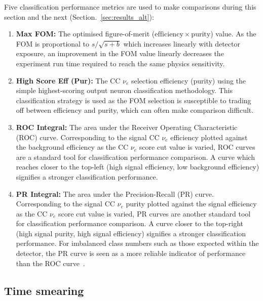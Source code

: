 Five classification performance metrics are used to make comparisons during this section and the
next (Section.~\ref{sec:results_alt}):
\begin{enumerate}
    \item \textbf{Max FOM:} The optimised figure-of-merit
          ($\mathrm{efficiency}\times\mathrm{purity}$) value. As the FOM is proportional to
          $s/\sqrt{s+b}$ which increases linearly with detector exposure, an improvement in the
          FOM value linearly decreases the experiment run time required to reach the same physics
          sensitivity.
    \item \textbf{High Score Eff (Pur):} The CC $\nu_{e}$ selection efficiency (purity) using the
          simple highest-scoring output neuron classification methodology. This classification
          strategy is used as the FOM selection is susceptible to trading off between efficiency
          and purity, which can often make comparison difficult.
    \item \textbf{ROC Integral:} The area under the Receiver Operating Characteristic (ROC) curve.
          Corresponding to the signal CC $\nu_{e}$ efficiency plotted against the background
          efficiency as the CC $\nu_{e}$ score cut value is varied, ROC curves are a standard tool
          for classification performance comparison. A curve which reaches closer to the top-left
          (high signal efficiency, low background efficiency) signifies a stronger classification
          performance.
    \item \textbf{PR Integral:} The area under the Precision-Recall (PR) curve. Corresponding to
          the signal CC $\nu_{e}$ purity plotted against the signal efficiency as the CC $\nu_{e}$
          score cut value is varied, PR curves are another standard tool for classification
          performance comparison. A curve closer to the top-right (high signal purity, high signal
          efficiency) signifies a stronger classification performance. For imbalanced class
          numbers such as those expected within the \chipsfive detector, the PR curve is seen as a
          more reliable indicator of performance than the ROC curve~\cite{saito2015}.
\end{enumerate}

\subsection*{Time smearing} %

